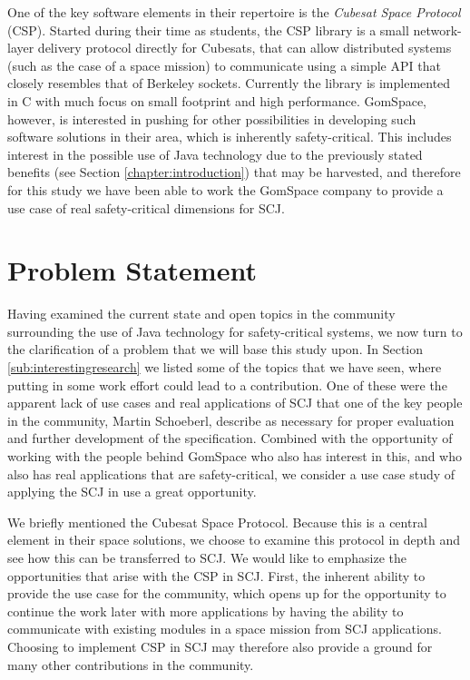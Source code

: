 One of the key software elements in their repertoire is the \textit{Cubesat Space Protocol} (CSP). Started during their time as students, the CSP library is a small network-layer delivery protocol directly for Cubesats, that can allow distributed systems (such as the case of a space mission) to communicate using a simple API that closely resembles that of Berkeley sockets. Currently the library is implemented in C with much focus on small footprint and high performance. GomSpace, however, is interested in pushing for other possibilities in developing such software solutions in their area, which is inherently safety-critical. This includes interest in the possible use of Java technology due to the previously stated benefits (see Section \ref{chapter:introduction}) that may be harvested, and therefore for this study we have been able to work the GomSpace company to provide a use case of real safety-critical dimensions for SCJ.


\section{Problem Statement} %
\label{sec:problem_statement}
Having examined the current state and open topics in the community surrounding the use of Java technology for safety-critical systems, we now turn to the clarification of a problem that we will base this study upon. In Section \ref{sub:interestingresearch} we listed some of the topics that we have seen, where putting in some work effort could lead to a contribution. One of these were the apparent lack of use cases and real applications of SCJ that one of the key people in the community, Martin Schoeberl, describe as necessary for proper evaluation and further development of the specification\cite{Schoeberl:2012:SCJonJava}. Combined with the opportunity of working with the people behind GomSpace who also has interest in this, and who also has real applications that are safety-critical, we consider a use case study of applying the SCJ in use a great opportunity.

We briefly mentioned the Cubesat Space Protocol. Because this is a central element in their space solutions, we choose to examine this protocol in depth and see how this can be transferred to SCJ. We would like to emphasize the opportunities that arise with the CSP in SCJ. First, the inherent ability to provide the use case for the community, which opens up for the opportunity to continue the work later with more applications by having the ability to communicate with existing modules in a space mission from SCJ applications. Choosing to implement CSP in SCJ may therefore also provide a ground for many other contributions in the community.


